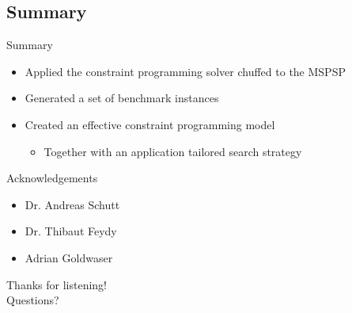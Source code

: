\documentclass{beamer}
\begin{document}
\subsection{Summary}
\begin{frame}{Summary}
	\begin{itemize}
		\item Applied the constraint programming solver chuffed to the MSPSP\pause
		\vspace{2mm}
		\item Generated a set of benchmark instances\pause
		\vspace{2mm}
		\item Created an effective constraint programming model\vspace{2mm}
		\begin{itemize}
			\item Together with an application tailored search strategy
		\end{itemize}
	\end{itemize}
\end{frame}


\begin{frame}{Acknowledgements}
	\begin{itemize}
		\item Dr. Andreas Schutt
		\vspace{2mm}
		\item Dr. Thibaut Feydy
		\vspace{2mm}
		\item Adrian Goldwaser
	\end{itemize}
\end{frame}

\begin{frame}{}
	\centering
	{\Large Thanks for listening!\vspace{1cm}\\
	Questions?}
\end{frame}
\end{document}
